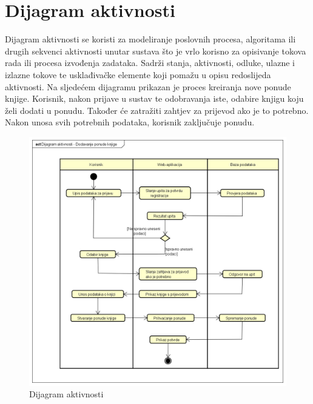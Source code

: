 			
			\eject 
		
		\section{Dijagram aktivnosti}
			
			
			Dijagram aktivnosti se koristi za modeliranje poslovnih procesa, algoritama ili drugih sekvenci aktivnosti unutar sustava što je vrlo korisno za opisivanje tokova rada ili procesa izvođenja zadataka. Sadrži stanja, aktivnosti, odluke, ulazne i izlazne tokove te usklađivačke elemente koji pomažu u opisu redoslijeda aktivnosti. Na sljedećem dijagramu prikazan je proces kreiranja nove ponude knjige. Korisnik, nakon prijave u sustav te odobravanja iste, odabire knjigu koju želi dodati u ponudu. Također će zatražiti zahtjev za prijevod ako je to potrebno.
			Nakon unosa svih potrebnih podataka, korisnik zaključuje ponudu. 
			
			\eject
			
			
			\begin{figure}[H]
				\includegraphics[width=\textwidth]{dijagrami/Dijagram aktivnosti.PNG} %
				\centering
				\caption{Dijagram aktivnosti }
				\label{fig:dijagramaktivnosti1}
			\end{figure}
			
			\eject
			
